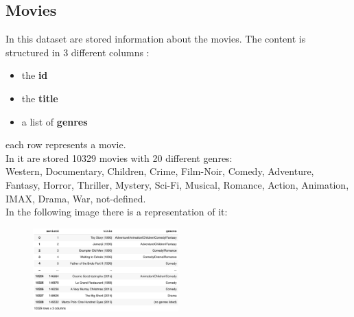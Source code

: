 \documentclass{article}
\begin{document}
\subsection{Movies}
In this dataset are stored information about the movies. The content is structured in 3 different columns : 
\begin{itemize}
      \item the \textbf{id}
      \item the \textbf{title}
      \item a list of \textbf{genres}
\end{itemize}
each row represents a movie.\\ In it are stored 10329 movies with 20 different genres:\\ Western, Documentary, Children, Crime, Film-Noir, Comedy, Adventure, Fantasy, Horror, Thriller, Mystery, Sci-Fi, Musical, Romance, Action, Animation, IMAX, Drama, War, not-defined. \\
In the following image there is a representation of it:
\begin{figure}[ht]
      \begin{center}
            \includegraphics[width=0.5\textwidth]{images/movies data.png}
      \end{center}
\end{figure}
\end{document}

